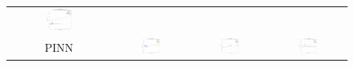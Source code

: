 \documentclass[12pt,a4paper]{article}
\begin{document}
\begin{figure}[H]
\begin{tabular}{cccc}
      \includegraphics[width=0.27\textwidth]{../inference_results/test/LSTM/three_body/500/full_trajectory_spaceship_0.png} \\
      PINN &
      \includegraphics[width=0.27\textwidth]{../inference_results/train/PINN/three_body/500/full_trajectory_spaceship_0.png} &
      \includegraphics[width=0.27\textwidth]{../inference_results/val/PINN/three_body/500/full_trajectory_spaceship_0.png} &
      \includegraphics[width=0.27\textwidth]{../inference_results/test/PINN/three_body/500/full_trajectory_spaceship_0.png}
  \end{tabular}
\end{figure}
\end{document}
